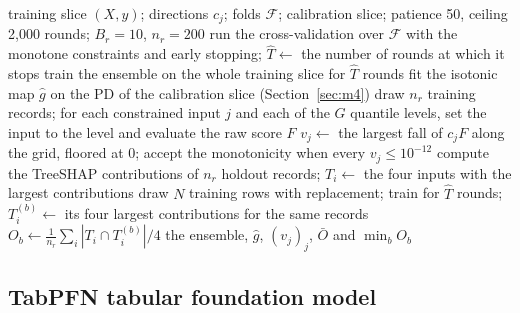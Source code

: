 \begin{algorithm}[htbp]
\caption{Fit of the monotone gradient boosting machine, its isotonic map, the partial-dependence check and the stability of the reasons}
\label{alg:cs-gbm}
\begin{algorithmic}[1]
\Require training slice $(X,y)$; directions $c_j$; folds $\mathcal{F}$; calibration slice; patience 50, ceiling 2,000 rounds; $B_r=10$, $n_r=200$
\State run the cross-validation over $\mathcal{F}$ with the monotone constraints and early stopping; $\hat T\gets$ the number of rounds at which it stops
\State train the ensemble on the whole training slice for $\hat T$ rounds
\State fit the isotonic map $\hat g$ on the PD of the calibration slice (Section~\ref{sec:m4})
\State draw $n_r$ training records; for each constrained input $j$ and each of the $G$ quantile levels, set the input to the level and evaluate the raw score $F$
\State $v_j\gets$ the largest fall of $c_j F$ along the grid, floored at 0; accept the monotonicity when every $v_j\le10^{-12}$ 
\State compute the TreeSHAP contributions of $n_r$ holdout records; $T_i\gets$ the four inputs with the largest contributions
  \State draw $N$ training rows with replacement; train for $\hat T$ rounds; $T_i^{(b)}\gets$ its four largest contributions for the same records
  \State $O_b\gets\frac1{n_r}\sum_i|T_i\cap T_i^{(b)}|/4$ 
\EndFor
\State \Return the ensemble, $\hat g$, $(v_j)_j$, $\bar O$ and $\min_b O_b$
\end{algorithmic}
\end{algorithm}

\subsection{TabPFN tabular foundation model}
\label{sec:m6}

